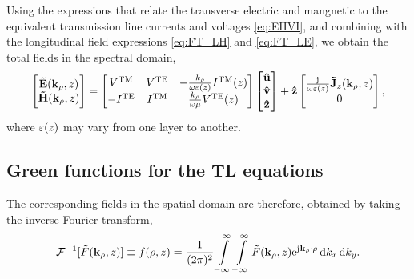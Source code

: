 \documentclass[12pt]{article}
\begin{document}
Using the expressions that relate the transverse electric and mangnetic to the equivalent transmission line currents and voltages \eqref{eq:EHVI}, and combining with the longitudinal field expressions \eqref{eq:FT_LH} and \eqref{eq:FT_LE}, we obtain the total fields in the spectral domain,
%
%
\begin{equation}
  \begin{bmatrix}
    \mathbf{\tilde{E}}(\mathbf{k}_{\rho},z) \\
    \mathbf{\tilde{H}}(\mathbf{k}_{\rho},z)
  \end{bmatrix}
  =
  \begin{bmatrix}
    V^{\mathrm{TM}} & V^{\mathrm{TE}} & -\frac{k_{\rho}}{\omega \varepsilon(z)}   I^{\mathrm{TM}}(z) \\
    -I^{\mathrm{TE}} & I^{\mathrm{TM}} & \frac{k_{\rho}}{\omega \mu}   V^{\mathrm{TE}}(z)
  \end{bmatrix}
  \begin{bmatrix}
    \mathbf{\hat u} \\
    \mathbf{\hat v} \\
    \mathbf{\hat z} \\
  \end{bmatrix} + \mathbf{\hat z}
  \begin{bmatrix}
    \frac{\mathrm{j}\mkern1mu}{\omega \varepsilon(z)}     \mathbf{\tilde{J}}_z(\mathbf{k}_{\rho},z) \\
    0
    \end{bmatrix},
    \label{eq:EHVI}
\end{equation}
%
where $\varepsilon(z)$ may vary from one layer to another.
\subsection{Green functions for the TL equations}
%















The corresponding fields in the spatial domain are therefore, obtained by taking the inverse Fourier transform,
%
\begin{equation}
  \mathcal{F}^{-1}[\tilde{F}(\mathbf{k}_{\rho},z)] \equiv f(\mathbf{\rho},z) = \frac{1}{(2 \pi )^2}\int\limits_{-\infty}^\infty \int\limits_{-\infty}^\infty
  \tilde{F}(\mathbf{k}_{\rho},z) \mathrm{e}^{\mathrm{j}\mkern1mu \mathbf{k}_{\rho} \cdot \mathbf{\rho}} \mathop{}\!\mathrm{d}{k_x} \mathop{}\!\mathrm{d}{k_y}.
  \label{eq:invFourier}
\end{equation}
%
\end{document}
